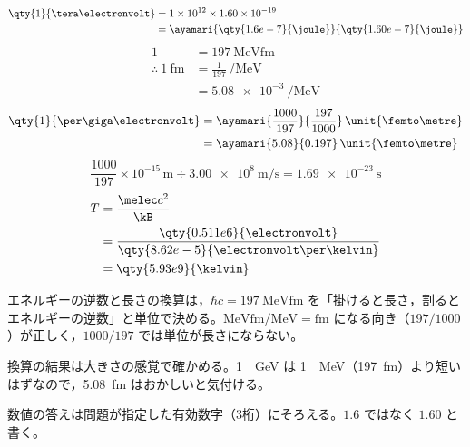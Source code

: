 \begin{align*}
  \qty{1}{\tera\electronvolt}&=1\times10^{12}\times1.60\times10^{-19}\\
  &=\ayamari{\qty{1.6e-7}{\joule}}{\qty{1.60e-7}{\joule}}
\end{align*}
\begin{align*}
  1&=\qty{197}{\mega\electronvolt\femto\metre}\\
  \therefore\ \qty{1}{\femto\metre}&=\frac{1}{197}\,\unit{\per\mega\electronvolt}\\
  &=\qty{5.08e-3}{\per\mega\electronvolt}
\end{align*}
\begin{align*}
  \qty{1}{\per\giga\electronvolt}&=\ayamari{\frac{1000}{197}}{\frac{197}{1000}}\,\unit{\femto\metre}\\
  &=\ayamari{5.08}{0.197}\,\unit{\femto\metre}
\end{align*}
\[ \frac{1000}{197}\times10^{-15}\,\unit{\metre}\div\qty{3.00e8}{\metre\per\second}=\qty{1.69e-23}{\second} \]
\begin{align*}
  T&=\frac{\melec c^{2}}{\kB}\\
  &=\frac{\qty{0.511e6}{\electronvolt}}{\qty{8.62e-5}{\electronvolt\per\kelvin}}\\
  &=\qty{5.93e9}{\kelvin}
\end{align*}
\item エネルギーの逆数と長さの換算は，$\hbar c=\qty{197}{\mega\electronvolt\femto\metre}$ を「掛けると長さ，割るとエネルギーの逆数」と単位で決める。$\unit{\mega\electronvolt\femto\metre}/\unit{\mega\electronvolt}=\unit{\femto\metre}$ になる向き（$197/1000$）が正しく，$1000/197$ では単位が長さにならない。
\item 換算の結果は大きさの感覚で確かめる。\qty{1}{\per\giga\electronvolt} は \qty{1}{\per\mega\electronvolt}（\qty{197}{\femto\metre}）より短いはずなので，\qty{5.08}{\femto\metre} はおかしいと気付ける。
\item 数値の答えは問題が指定した有効数字（3桁）にそろえる。$1.6$ ではなく $1.60$ と書く。
